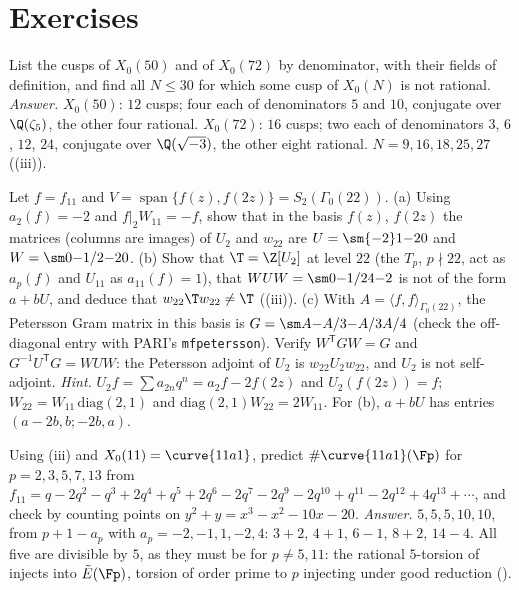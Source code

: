 \section{Exercises}\label{sec:moddeg:exercises}

\begin{exercise}\label{ex:moddeg:ex-cusps}
List the cusps of $X_0(50)$ and of $X_0(72)$ by denominator, with their fields of definition, and find all $N\le30$ for which some cusp of $X_0(N)$ is not rational.
\emph{Answer.} $X_0(50)$: $12$ cusps; four each of denominators $5$ and $10$, conjugate over $\Q(\zeta_5)$, the other four rational. $X_0(72)$: $16$ cusps; two each of denominators $3$, $6$, $12$, $24$, conjugate
over $\Q(\sqrt{-3})$, the other eight rational. $N=9,16,18,25,27$ ((iii)).
\end{exercise}

\begin{exercise}\label{ex:moddeg:ex-u2}
Let $f=f_{11}$ and $V=\operatorname{span}\{f(z),f(2z)\}=S_2(\Gamma_0(22))$. (a) Using $a_2(f)=-2$ and $f|_2W_{11}=-f$, show that in the basis $f(z)$, $f(2z)$ the matrices (columns are images) of $U_2$ and
$w_{22}$ are $U=\sm{-2}1{-2}0$ and $W=\sm0{-1/2}{-2}0$. (b) Show that $\T=\Z[U_2]$ at level $22$ (the $T_p$, $p\nmid22$, act as $a_p(f)$ and $U_{11}$ as $a_{11}(f)=1$), that $WUW=\sm0{-1/2}4{-2}$ is not of the form $a+bU$, and deduce that $w_{22}\T w_{22}\ne\T$
((iii)). (c) With $A=\langle f,f\rangle_{\Gamma_0(22)}$, the Petersson Gram matrix in this basis is $G=\sm A{-A/3}{-A/3}{A/4}$ (check the off-diagonal entry with PARI's
\texttt{mfpetersson}). Verify $W^{\mathsf T}GW=G$ and $G^{-1}U^{\mathsf T}G=WUW$: the Petersson adjoint of $U_2$ is $w_{22}U_2w_{22}$, and $U_2$ is not self-adjoint.
\emph{Hint.} $U_2f=\sum a_{2n}q^n=a_2f-2f(2z)$ and $U_2(f(2z))=f$; $W_{22}=W_{11}\,\mathrm{diag}(2,1)$ and $\mathrm{diag}(2,1)W_{22}=2W_{11}$. For (b), $a+bU$ has entries $(a-2b,b;-2b,a)$.
\end{exercise}

\begin{exercise}\label{ex:moddeg:ex-counts}
Using (iii) and $X_0(11)=\curve{11a1}$, predict $\#\curve{11a1}(\Fp)$ for $p=2,3,5,7,13$ from $f_{11}=q-2q^2-q^3+2q^4+q^5+2q^6-2q^7-2q^9-2q^{10}+q^{11}-2q^{12}+4q^{13}+\cdots$, and
check by counting points on $y^2+y=x^3-x^2-10x-20$. \emph{Answer.} $5,5,5,10,10$, from $p+1-a_p$ with $a_p=-2,-1,1,-2,4$: $3+2$, $4+1$, $6-1$, $8+2$, $14-4$.
All five are divisible by $5$, as they must be for $p\ne5,11$: the rational $5$-torsion of  injects into $\tilde E(\Fp)$, torsion of order prime to $p$ injecting under
good reduction ().
\end{exercise}

